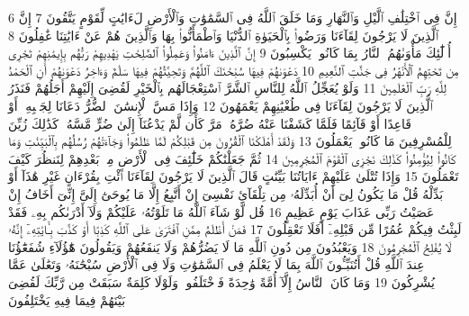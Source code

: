 {\tiny\colorbox{cl_aya}{6}} إِنَّ فِى ٱخْتِلَٰفِ ٱلَّيْلِ وَٱلنَّهَارِ وَمَا خَلَقَ ٱللَّهُ فِى ٱلسَّمَٰوَٰتِ وَٱلْأَرْضِ لَءَايَٰتٍ لِّقَوْمٍ يَتَّقُونَ
{\tiny\colorbox{cl_aya}{7}} إِنَّ ٱلَّذِينَ لَا يَرْجُونَ لِقَآءَنَا وَرَضُوا۟ بِٱلْحَيَوٰةِ ٱلدُّنْيَا وَٱطْمَأَنُّوا۟ بِهَا وَٱلَّذِينَ هُمْ عَنْ ءَايَٰتِنَا غَٰفِلُونَ
{\tiny\colorbox{cl_aya}{8}} أُو۟لَٰٓئِكَ مَأْوَىٰهُمُ ٱلنَّارُ بِمَا كَانُوا۟ يَكْسِبُونَ
{\tiny\colorbox{cl_aya}{9}} إِنَّ ٱلَّذِينَ ءَامَنُوا۟ وَعَمِلُوا۟ ٱلصَّٰلِحَٰتِ يَهْدِيهِمْ رَبُّهُم بِإِيمَٰنِهِمْ تَجْرِى مِن تَحْتِهِمُ ٱلْأَنْهَٰرُ فِى جَنَّٰتِ ٱلنَّعِيمِ
{\tiny\colorbox{cl_aya}{10}} دَعْوَىٰهُمْ فِيهَا سُبْحَٰنَكَ ٱللَّهُمَّ وَتَحِيَّتُهُمْ فِيهَا سَلَٰمٌ وَءَاخِرُ دَعْوَىٰهُمْ أَنِ ٱلْحَمْدُ لِلَّهِ رَبِّ ٱلْعَٰلَمِينَ
{\tiny\colorbox{cl_aya}{11}} وَلَوْ يُعَجِّلُ ٱللَّهُ لِلنَّاسِ ٱلشَّرَّ ٱسْتِعْجَالَهُم بِٱلْخَيْرِ لَقُضِىَ إِلَيْهِمْ أَجَلُهُمْ فَنَذَرُ ٱلَّذِينَ لَا يَرْجُونَ لِقَآءَنَا فِى طُغْيَٰنِهِمْ يَعْمَهُونَ
{\tiny\colorbox{cl_aya}{12}} وَإِذَا مَسَّ ٱلْإِنسَٰنَ ٱلضُّرُّ دَعَانَا لِجَنۢبِهِۦٓ أَوْ قَاعِدًا أَوْ قَآئِمًا فَلَمَّا كَشَفْنَا عَنْهُ ضُرَّهُۥ مَرَّ كَأَن لَّمْ يَدْعُنَآ إِلَىٰ ضُرٍّ مَّسَّهُۥ كَذَٰلِكَ زُيِّنَ لِلْمُسْرِفِينَ مَا كَانُوا۟ يَعْمَلُونَ
{\tiny\colorbox{cl_aya}{13}} وَلَقَدْ أَهْلَكْنَا ٱلْقُرُونَ مِن قَبْلِكُمْ لَمَّا ظَلَمُوا۟ وَجَآءَتْهُمْ رُسُلُهُم بِٱلْبَيِّنَٰتِ وَمَا كَانُوا۟ لِيُؤْمِنُوا۟ كَذَٰلِكَ نَجْزِى ٱلْقَوْمَ ٱلْمُجْرِمِينَ
{\tiny\colorbox{cl_aya}{14}} ثُمَّ جَعَلْنَٰكُمْ خَلَٰٓئِفَ فِى ٱلْأَرْضِ مِنۢ بَعْدِهِمْ لِنَنظُرَ كَيْفَ تَعْمَلُونَ
{\tiny\colorbox{cl_aya}{15}} وَإِذَا تُتْلَىٰ عَلَيْهِمْ ءَايَاتُنَا بَيِّنَٰتٍ قَالَ ٱلَّذِينَ لَا يَرْجُونَ لِقَآءَنَا ٱئْتِ بِقُرْءَانٍ غَيْرِ هَٰذَآ أَوْ بَدِّلْهُ قُلْ مَا يَكُونُ لِىٓ أَنْ أُبَدِّلَهُۥ مِن تِلْقَآئِ نَفْسِىٓ إِنْ أَتَّبِعُ إِلَّا مَا يُوحَىٰٓ إِلَىَّ إِنِّىٓ أَخَافُ إِنْ عَصَيْتُ رَبِّى عَذَابَ يَوْمٍ عَظِيمٍ
{\tiny\colorbox{cl_aya}{16}} قُل لَّوْ شَآءَ ٱللَّهُ مَا تَلَوْتُهُۥ عَلَيْكُمْ وَلَآ أَدْرَىٰكُم بِهِۦ فَقَدْ لَبِثْتُ فِيكُمْ عُمُرًا مِّن قَبْلِهِۦٓ أَفَلَا تَعْقِلُونَ
{\tiny\colorbox{cl_aya}{17}} فَمَنْ أَظْلَمُ مِمَّنِ ٱفْتَرَىٰ عَلَى ٱللَّهِ كَذِبًا أَوْ كَذَّبَ بِـَٔايَٰتِهِۦٓ إِنَّهُۥ لَا يُفْلِحُ ٱلْمُجْرِمُونَ
{\tiny\colorbox{cl_aya}{18}} وَيَعْبُدُونَ مِن دُونِ ٱللَّهِ مَا لَا يَضُرُّهُمْ وَلَا يَنفَعُهُمْ وَيَقُولُونَ هَٰٓؤُلَآءِ شُفَعَٰٓؤُنَا عِندَ ٱللَّهِ قُلْ أَتُنَبِّـُٔونَ ٱللَّهَ بِمَا لَا يَعْلَمُ فِى ٱلسَّمَٰوَٰتِ وَلَا فِى ٱلْأَرْضِ سُبْحَٰنَهُۥ وَتَعَٰلَىٰ عَمَّا يُشْرِكُونَ
{\tiny\colorbox{cl_aya}{19}} وَمَا كَانَ ٱلنَّاسُ إِلَّآ أُمَّةً وَٰحِدَةً فَٱخْتَلَفُوا۟ وَلَوْلَا كَلِمَةٌ سَبَقَتْ مِن رَّبِّكَ لَقُضِىَ بَيْنَهُمْ فِيمَا فِيهِ يَخْتَلِفُونَ
